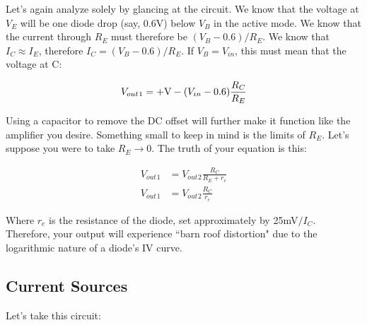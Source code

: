 \documentclass[12pt]{report}
\newcommand{\V}{{\rm V}}
\newcommand{\Vo}{{V}_{out}}
\newcommand{\Vi}{{V}_{in}}
\begin{document}
Let's again analyze solely by glancing at the circuit. We know that the voltage at $V_E$ will be one diode drop (say, 0.6V) below $V_B$ in the active mode. We know that the current through $R_E$ must therefore be $(V_B - 0.6) / R_E$. We know that $I_C \approx I_E$, therefore $I_C = (V_B - 0.6) / R_E$. If $V_B = \Vi$, this must mean that the voltage at C: 

\begin{equation} \label{trans3}
\begin{split}
\Vo{}_1 = +\V - (\Vi - 0.6)\frac{R_C}{R_E}
\end{split}
\end{equation}

Using a capacitor to remove the DC offset will further make it function like the amplifier you desire. Something small to keep in mind is the limits of $R_E$. Let's suppose you were to take $R_E \rightarrow 0$. The truth of your equation is this: 

\begin{equation} \label{trans3}
\begin{split}
\Vo{}_1 &= \Vo{}_2\frac{R_C}{R_E + r_e} \\
\Vo{}_1 &= \Vo{}_2\frac{R_C}{r_e}
\end{split}
\end{equation}

Where $r_e$ is the resistance of the diode, set approximately by 25mV$/I_C$. Therefore, your output will experience ``barn roof distortion" due to the logarithmic nature of a diode's IV curve.  


\vfill\pagebreak


\subsection{Current Sources}

Let's take this circuit: 
\end{document}
